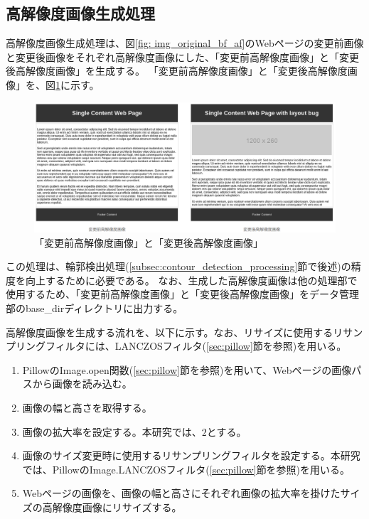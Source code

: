 \subsection{高解像度画像生成処理}\label{subsec:Generate_high_images}
高解像度画像生成処理は、図\ref{fig: img_original_bf_af}のWebページの変更前画像と変更後画像をそれぞれ高解像度画像にした、「変更前高解像度画像」と「変更後高解像度画像」を生成する。
「変更前高解像度画像」と「変更後高解像度画像」を、図\ref{fig: img_high_original_bf_af}に示す。
\begin{figure}[tp]
    \begin{center}
        \includegraphics[width=1.0\columnwidth]{image/4_img_high_original_bf_af.png}
        \caption{「変更前高解像度画像」と「変更後高解像度画像」}
        \label{fig: img_high_original_bf_af}
    \end{center}
\end{figure}
この処理は、輪郭検出処理(\ref{subsec:contour_detection_processing}節で後述)の精度を向上するために必要である。
なお、生成した高解像度画像は他の処理部で使用するため、「変更前高解像度画像」と「変更後高解像度画像」をデータ管理部のbase\_dirディレクトリに出力する。
\par
高解像度画像を生成する流れを、以下に示す。なお、リサイズに使用するリサンプリングフィルタには、LANCZOSフィルタ(\ref{sec:pillow}節を参照)を用いる。
\begin{enumerate}
    \item PillowのImage.open関数(\ref{sec:pillow}節を参照)を用いて、Webページの画像パスから画像を読み込む。
    \item 画像の幅と高さを取得する。
    \item 画像の拡大率を設定する。本研究では、$2$とする。
    \item 画像のサイズ変更時に使用するリサンプリングフィルタを設定する。本研究では、PillowのImage.LANCZOSフィルタ(\ref{sec:pillow}節を参照)を用いる。
    \item Webページの画像を、画像の幅と高さにそれぞれ画像の拡大率を掛けたサイズの高解像度画像にリサイズする。
\end{enumerate}


